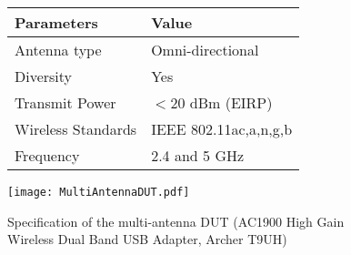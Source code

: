 \begin{figure}[h]
    \begin{minipage}[c]{.7\textwidth}%
        \begin {tabular} {|l|l|} 
\toprule
Parameters & Value \\ 
\midrule 
Antenna type & Omni-directional \\
Diversity & Yes \\
Transmit Power &  $<$20 dBm (\acs{EIRP})\\ 
Wireless Standards & \acs{IEEE} 802.11ac,a,n,g,b \\
Frequency & 2.4 and 5 GHz \\
\bottomrule
\end {tabular}    \end{minipage}
    \hfill
    \begin{minipage}[c]{.28\textwidth}
        \texttt{[image: MultiAntennaDUT.pdf]}
    \end{minipage}
    \caption{Specification of the multi-antenna \acs{DUT} (AC1900 High Gain Wireless Dual Band USB Adapter, Archer T9UH)\cite{tplinkmulti}}
\label{fig:multiAntennaDUT}
\end{figure}     
